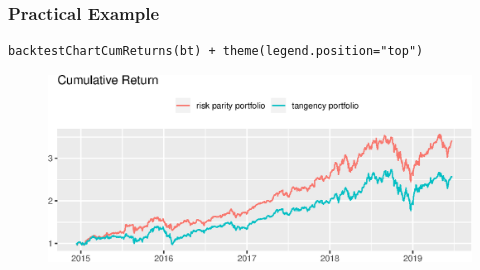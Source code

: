 \documentclass[aspectratio=169]{beamer}
\begin{document}
\begin{frame}[fragile]
\frametitle{Practical Example}
\begin{verbatim}
backtestChartCumReturns(bt) + theme(legend.position="top")
\end{verbatim}
\begin{figure}[!htb]
  \centering
  \includegraphics[scale=.7]{codes/returns.eps}
\end{figure}
\end{frame}

%
%
\end{document}
